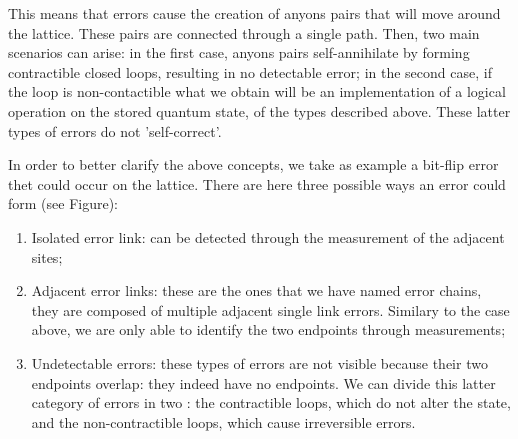 \documentclass[12pt]{report}
\begin{document}
	\begin{minipage}{1 \textwidth}
		
		This means that errors cause the creation of anyons pairs that will move around the lattice. These pairs are connected through a single path. Then, two main scenarios can arise: in the first case, anyons pairs self-annihilate by forming contractible closed loops, resulting in no detectable error; in the second case, if the loop is non-contactible what we obtain will be an implementation of a logical operation on the stored quantum state, of the types described above. These latter types of errors do not 'self-correct'. \newline
		
		In order to better clarify the above concepts, we take as example a bit-flip error thet could occur on the lattice. There are here three possible ways an error could form (see Figure): \newline
		
		\begin{enumerate}
			\item Isolated error link: can be detected through the measurement of the adjacent sites;
			
			
			\item Adjacent error links: these are the ones that we have named error chains, they are composed of multiple adjacent single link errors. Similary to the case above, we are only able to identify the two endpoints through measurements;
			
			
			\item Undetectable errors: these types of errors are not visible because their two endpoints overlap: they indeed have no endpoints. We can divide this latter category of errors in two : the contractible loops, which do not alter the state, and the non-contractible loops, which cause irreversible errors.
			
			
		\end{enumerate}
		

\end{minipage}
\end{document}
